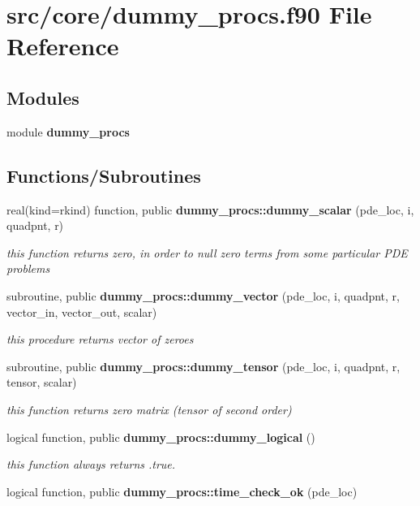 \section{src/core/dummy\+\_\+procs.f90 File Reference}
\label{dummy__procs_8f90}
\subsection*{Modules}
\begin{DoxyCompactItemize}
\item 
module {\bf dummy\+\_\+procs}
\end{DoxyCompactItemize}
\subsection*{Functions/\+Subroutines}
\begin{DoxyCompactItemize}
\item 
real(kind=rkind) function, public {\bf dummy\+\_\+procs\+::dummy\+\_\+scalar} (pde\+\_\+loc, i, quadpnt, r)
\begin{DoxyCompactList}\small\item\em this function returns zero, in order to null zero terms from some particular P\+DE problems \end{DoxyCompactList}\item 
subroutine, public {\bf dummy\+\_\+procs\+::dummy\+\_\+vector} (pde\+\_\+loc, i, quadpnt, r, vector\+\_\+in, vector\+\_\+out, scalar)
\begin{DoxyCompactList}\small\item\em this procedure returns vector of zeroes \end{DoxyCompactList}\item 
subroutine, public {\bf dummy\+\_\+procs\+::dummy\+\_\+tensor} (pde\+\_\+loc, i, quadpnt, r, tensor, scalar)
\begin{DoxyCompactList}\small\item\em this function returns zero matrix (tensor of second order) \end{DoxyCompactList}\item 
logical function, public {\bf dummy\+\_\+procs\+::dummy\+\_\+logical} ()
\begin{DoxyCompactList}\small\item\em this function always returns .true. \end{DoxyCompactList}\item 
logical function, public {\bf dummy\+\_\+procs\+::time\+\_\+check\+\_\+ok} (pde\+\_\+loc)
\end{DoxyCompactItemize}
